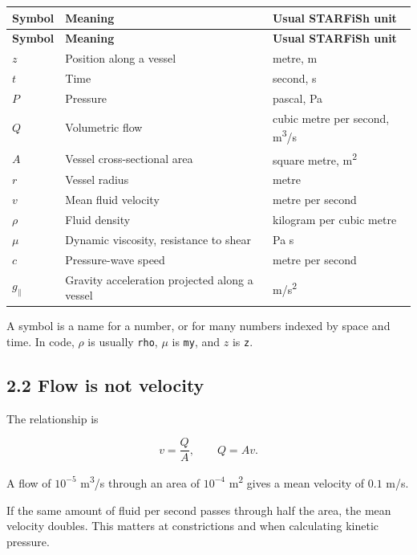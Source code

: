 \documentclass[11pt,a4paper]{article}
\begin{document}
\begingroup\footnotesize
\setlength{\tabcolsep}{4pt}
\begin{longtable}{>{\raggedright\arraybackslash}p{}>{\raggedright\arraybackslash}p{}>{\raggedright\arraybackslash}p{}}
\toprule
\textbf{Symbol} & \textbf{Meaning} & \textbf{Usual STARFiSh unit} \\
\midrule
\endfirsthead
\textbf{Symbol} & \textbf{Meaning} & \textbf{Usual STARFiSh unit} \\
\midrule
\endhead
\bottomrule
\endfoot
\(z\) & Position along a vessel & metre, m \\
\(t\) & Time & second, s \\
\(P\) & Pressure & pascal, Pa \\
\(Q\) & Volumetric flow & cubic metre per second, m\textsuperscript{3}/s \\
\(A\) & Vessel cross-sectional area & square metre, m\textsuperscript{2} \\
\(r\) & Vessel radius & metre \\
\(v\) & Mean fluid velocity & metre per second \\
\(\rho\) & Fluid density & kilogram per cubic metre \\
\(\mu\) & Dynamic viscosity, resistance to shear & Pa s \\
\(c\) & Pressure-wave speed & metre per second \\
\(g_\parallel\) & Gravity acceleration projected along a vessel & m/s\textsuperscript{2} \\
\end{longtable}
\endgroup
A symbol is a name for a number, or for many numbers indexed by space and time. In code, \(\rho\) is usually \texttt{rho}, \(\mu\) is \texttt{my}, and \(z\) is \texttt{z}.

\subsection{2.2 Flow is not velocity}
The relationship is


\begingroup\small
\[
v=\frac{Q}{A},\qquad Q=Av.
\]
\endgroup


A flow of \(10^{-5}\) m\textsuperscript{3}/s through an area of \(10^{-4}\) m\textsuperscript{2} gives a mean velocity of \(0.1\) m/s.

If the same amount of fluid per second passes through half the area, the mean velocity doubles. This matters at constrictions and when calculating kinetic pressure.
\end{document}
